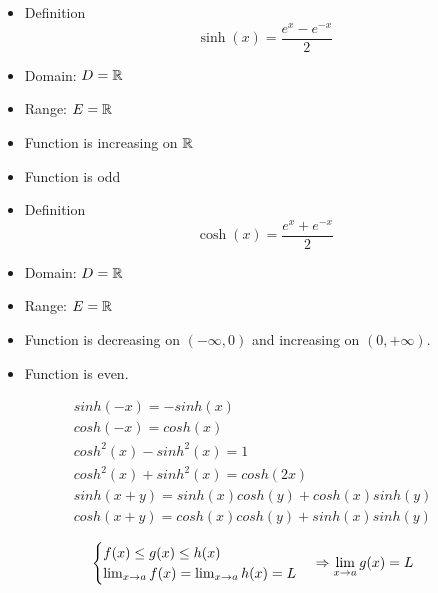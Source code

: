             \begin{itemize}
                \item Definition
                    \begin{equation}
                        \sinh(x) = \dfrac{e^{x} - e^{-x}}{2}
                    \end{equation}
                \item Domain: $D = \mathbb{R}$
                \item Range: $E = \mathbb{R}$
                \item Function is increasing on $\mathbb{R}$
                \item Function is odd
            \end{itemize}
            \begin{itemize}
                \item Definition
                    \begin{equation}
                        \cosh(x) = \dfrac{e^{x} + e^{-x}}{2}
                    \end{equation}
                \item Domain: $D = \mathbb{R}$
                \item Range: $E = \mathbb{R}$
                \item Function is decreasing on $(- \infty, 0)$ and increasing on $(0, + \infty)$.
                \item Function is even.
            \end{itemize}
            \begin{align}
                sinh(-x) = -sinh(x) \\
                cosh(-x) = cosh(x) \\
                cosh^{2}(x) - sinh^{2}(x) = 1 \\
                cosh^{2}(x) + sinh^{2}(x) = cosh(2x) \\
                sinh(x + y) = sinh(x)cosh(y) + cosh(x)sinh(y) \\
                cosh(x + y) = cosh(x)cosh(y) + sinh(x)sinh(y)
            \end{align}
    \hiiEND

    \begin{equation}
        \begin{cases}
            f(x) \leq g(x) \leq h(x) \\
            \lim_{x \to a} f(x) = \lim_{x \to a} h(x) = L
        \end{cases}
        \Rightarrow \lim_{x \to a} g(x) = L
    \end{equation}

